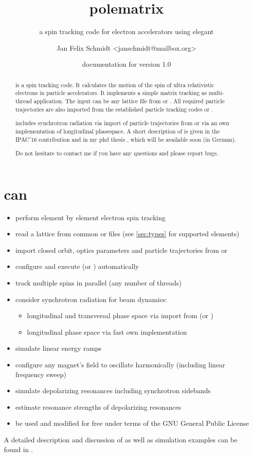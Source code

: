 \documentclass[a4paper]{scrartcl}
\author{Jan Felix Schmidt \textless janschmidt@mailbox.org\textgreater}
\title{polematrix}
\subtitle{a spin tracking code for electron accelerators using elegant}
\date{documentation for version 1.0}
\begin{document}
\maketitle

\begin{abstract}
  \polem is a spin tracking code. It calculates the motion of the spin of ultra
  relativistic electrons in particle accelerators. It implements a simple matrix tracking
  as multi-thread \cpp application. The input can be any lattice file from \ele or
  \madx. All required particle trajectories are also imported from the established
  particle tracking codes \ele or \madx.

  \polem includes synchrotron radiation via import of particle trajectories from \ele or
  via an own implementation of longitudinal phasespace. A short description of \polem is
  given in the IPAC'16 contribution \cite{IPAC16-decoh} and in my phd thesis \cite{dr},
  which will be available soon (in German).
  
  Do not hesitate to contact me if you have any questions and please report bugs.
\end{abstract}

\tableofcontents
\clearpage


\section{\polem can}
\label{sec:polem-can}

\begin{itemize}
\item perform element by element electron spin tracking
\item read a lattice from common \ele or \madx files (see \cref{sec:types} for supported elements)
\item import closed orbit, optics parameters and particle trajectories from \ele or
  \madx
\item configure and execute \ele (or \madx) automatically
\item track multiple spins in parallel (any number of threads)

\item consider synchrotron radiation for beam dynamics:
  \begin{itemize}
  \item longitudinal and transversal phase space via import from \ele (or \madx)
  \item longitudinal phase space via fast own implementation
  \end{itemize}
\item simulate linear energy ramps
\item configure any magnet's field to oscillate harmonically (including linear frequency sweep)
\item simulate depolarizing resonances including synchrotron sidebands
\item estimate resonance strengths of depolarizing resonances
\item be used and modified for free under terms of the GNU General Public License
\end{itemize}
A detailed description and discussion of \polem as well as simulation examples can be
found in \cite{dr}.
\end{document}
